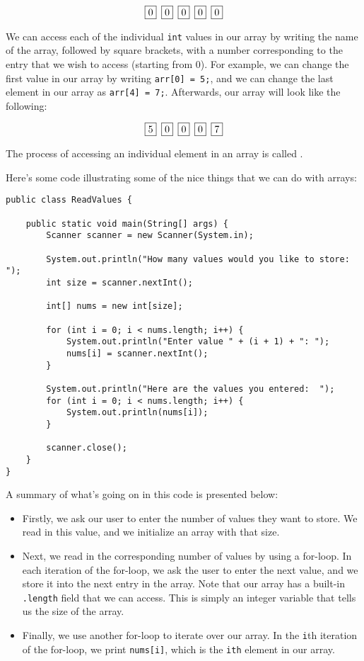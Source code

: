 \[
\fbox{0} \hspace*{.5em} \fbox{0} \hspace*{.5em} \fbox{0} \hspace*{.5em} \fbox{0} \hspace*{.5em} \fbox{0}
\]

\noindent We can access each of the individual \verb!int! values in our array by writing the name of the array, followed by square brackets, with a number corresponding to the entry that we wish to access (starting from $0$). For example, we can change the first value in our array by writing \verb!arr[0] = 5;!, and we can change the last element in our array as \verb!arr[4] = 7;!. Afterwards, our array will look like the following:

\[
\fbox{5} \hspace*{.5em} \fbox{0} \hspace*{.5em} \fbox{0} \hspace*{.5em} \fbox{0} \hspace*{.5em} \fbox{7}
\]

\noindent The process of accessing an individual element in an array is called . 

Here's some code illustrating some of the nice things that we can do with arrays:

\begin{lstlisting}
public class ReadValues {

	public static void main(String[] args) {
		Scanner scanner = new Scanner(System.in);

		System.out.println("How many values would you like to store: ");
		int size = scanner.nextInt();

		int[] nums = new int[size];

		for (int i = 0; i < nums.length; i++) {
			System.out.println("Enter value " + (i + 1) + ": ");
			nums[i] = scanner.nextInt();
		}

		System.out.println("Here are the values you entered:  ");
		for (int i = 0; i < nums.length; i++) {
			System.out.println(nums[i]);
		}

		scanner.close();
	}
}
\end{lstlisting}

A summary of what's going on in this code is presented below:

\begin{itemize}
    \item Firstly, we ask our user to enter the number of values they want to store. We read in this value, and we initialize an array with that size.  
    \item Next, we read in the corresponding number of values by using a for-loop. In each iteration of the for-loop, we ask the user to enter the next value, and we store it into the next entry in the array. Note that our array has a built-in \verb!.length! field that we can access. This is simply an integer variable that tells us the size of the array.
    \item Finally, we use another for-loop to iterate over our array. In the \verb!i!th iteration of the for-loop, we print \verb!nums[i]!, which is the \verb!ith! element in our array. 
\end{itemize}

